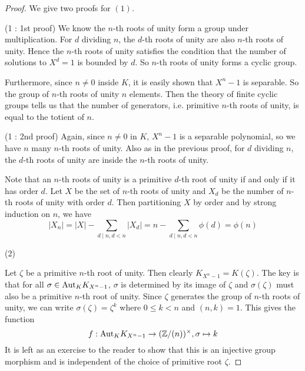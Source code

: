 \documentclass[../book.tex]{subfiles}
\begin{document}
\begin{proof} 
    We give two proofs for $(1)$.
    
    (1 : 1st proof)
    We know the $n$-th roots of unity form a group under multiplication.
    For $d$ dividing $n$, 
    the $d$-th roots of unity are also $n$-th roots of unity.
    Hence the $n$-th roots of unity satisfies the condition that
    the number of solutions to $X^d = 1$ is bounded by $d$.
    So $n$-th roots of unity forms a cyclic group.
    
    Furthermore, since $n \neq 0$ inside $K$, 
    it is easily shown that $X^n - 1$ is separable.
    So the group of $n$-th roots of unity $n$ elements. 
    Then the theory of finite cyclic groups tells us that 
    the number of generators, i.e. primitive $n$-th roots of unity,
    is equal to the totient of $n$.
    
    (1 : 2nd proof)
    Again, since $n \neq 0$ in $K$, $X^n - 1$ is a separable polynomial,
    so we have $n$ many $n$-th roots of unity. 
    Also as in the previous proof, for $d$ dividing $n$,
    the $d$-th roots of unity are inside the $n$-th roots of unity.
    
    Note that an $n$-th roots of unity is a primitive $d$-th root of unity
    if and only if it has order $d$.
    Let $X$ be the set of $n$-th roots of unity
    and $X_d$ be the number of $n$-th roots of unity with order $d$.
    Then partitioning $X$ by order and by strong induction on $n$, 
    we have \[
        |X_n| = |X| - \sum_{d \mid n, d < n} |X_d|
        = n - \sum_{d \mid n, d < n} \phi(d) = \phi(n)
    \]
    
    (2)
    
    Let $\zeta$ be a primitive $n$-th root of unity.
    Then clearly $K_{X^n - 1} = K(\zeta)$.
    The key is that for all $\sigma \in \mathrm{Aut}_{K}K_{X^n - 1}$,
    $\sigma$ is determined by its image of $\zeta$ and
    $\sigma(\zeta)$ must also be a primitive $n$-th root of unity.
    Since $\zeta$ generates the group of $n$-th roots of unity,
    we can write $\sigma(\zeta) = \zeta^k$ where $0 \leq k < n$ and $(n,k) = 1$.
    This gives the function \[
        f : \mathrm{Aut}_{K}K_{X^n - 1} \to (\mathbb{Z}/(n))^\times, \sigma \mapsto k
    \]
    It is left as an exercise to the reader to show that
    this is an injective group morphism and 
    is independent of the choice of primitive root $\zeta$. 
    
\end{proof}
\end{document}
